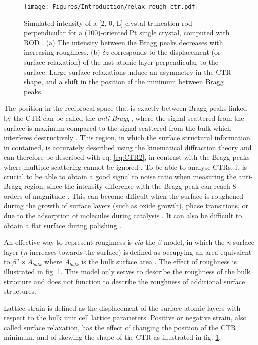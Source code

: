 \begin{figure}[!htb]
    \centering
    \texttt{[image: Figures/Introduction/relax\_rough\_ctr.pdf]}
    \caption{
    Simulated intensity of a [2, 0, L] crystal truncation rod perpendicular for a (100)-oriented Pt single crystal, computed with ROD \parencite{Vlieg2000}.
    (a) The intensity between the Bragg peaks decreases with increasing roughness.
    (b) $\delta z$ corresponds to the displacement (or surface relaxation) of the last atomic layer perpendicular to the surface.
    Large surface relaxations induce an asymmetry in the CTR shape, and a shift in the position of the minimum between Bragg peaks.
    }
    \label{fig:CTRSimulation}
\end{figure}

The position in the reciprocal space that is exactly between Bragg peaks linked by the CTR can be called the \textit{anti-Bragg} \parencite{Robinson1991}, where the signal scattered from the surface is maximum compared to the signal scattered from the bulk which interferes destructively \parencite{Willmott}.
This region, in which the surface structural information in contained, is accurately described using the kinematical diffraction theory and can therefore be described with eq. \ref{eq:CTR2}, in contrast with the Bragg peaks where multiple scattering cannot be ignored \parencite{Kaganer2007}.
To be able to analyse CTRs, it is crucial to be able to obtain a good signal to noise ratio when measuring the anti-Bragg region, since the intensity difference with the Bragg peak can reach 8 orders of magnitude \parencite{Fadenberger2010}.
This can become difficult when the surface is roughened during the growth of surface layers (such as oxide growth), phase transitions, or due to the adsorption of molecules during catalysis \parencite{Zhdanov1997, Zhdanov1998}.
It can also be difficult to obtain a flat surface during polishing \parencite{Musket1982}.

An effective way to represent roughness is \textit{via} the $\beta$ model, in which the \textit{n}-surface layer (\textit{n} increases towards the surface) is defined as occupying an area equivalent to $\beta^n \times A_{bulk}$ where $A_{bulk}$ is the bulk surface area \parencite{Robinson1986}.
The effect of roughness is illustrated in fig. \ref{fig:CTRSimulation}.
This model only serves to describe the roughness of the bulk structure and does not function to describe the roughness of additional surface structures.

Lattice strain is defined as the displacement of the surface atomic layers with respect to the bulk unit cell lattice parameters.
Positive or negative strain, also called surface relaxation,
has the effect of changing the position of the CTR minimum, and of skewing the shape of the CTR as illustrated in fig. \ref{fig:CTRSimulation}.

